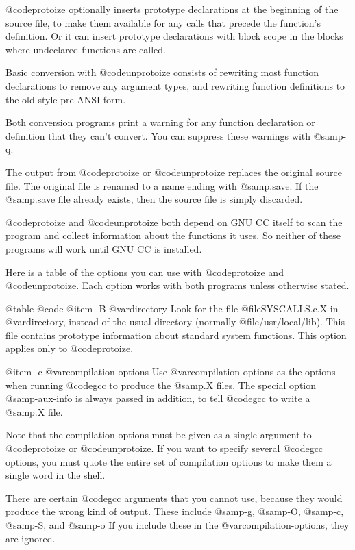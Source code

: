 {{@code{protoize} optionally inserts prototype declarations at the
beginning of the source file, to make them available for any calls that
precede the function's definition.  Or it can insert prototype
declarations with block scope in the blocks where undeclared functions
are called.

Basic conversion with @code{unprotoize} consists of rewriting most
function declarations to remove any argument types, and rewriting
function definitions to the old-style pre-ANSI form.

Both conversion programs print a warning for any function declaration or
definition that they can't convert.  You can suppress these warnings
with @samp{-q}.

The output from @code{protoize} or @code{unprotoize} replaces the
original source file.  The original file is renamed to a name ending
with @samp{.save}.  If the @samp{.save} file already exists, then 
the source file is simply discarded.

@code{protoize} and @code{unprotoize} both depend on GNU CC itself to
scan the program and collect information about the functions it uses.
So neither of these programs will work until GNU CC is installed.

Here is a table of the options you can use with @code{protoize} and
@code{unprotoize}.  Each option works with both programs unless
otherwise stated.

@table @code
@item -B @var{directory}
Look for the file @file{SYSCALLS.c.X} in @var{directory}, instead of the
usual directory (normally @file{/usr/local/lib}).  This file contains
prototype information about standard system functions.  This option
applies only to @code{protoize}.

@item -c @var{compilation-options}
Use  @var{compilation-options} as the options when running @code{gcc} to
produce the @samp{.X} files.  The special option @samp{-aux-info} is
always passed in addition, to tell @code{gcc} to write a @samp{.X} file.

Note that the compilation options must be given as a single argument to
@code{protoize} or @code{unprotoize}.  If you want to specify several
@code{gcc} options, you must quote the entire set of compilation options
to make them a single word in the shell.

There are certain @code{gcc} arguments that you cannot use, because they
would produce the wrong kind of output.  These include @samp{-g},
@samp{-O}, @samp{-c}, @samp{-S}, and @samp{-o} If you include these in
the @var{compilation-options}, they are ignored.

}}
